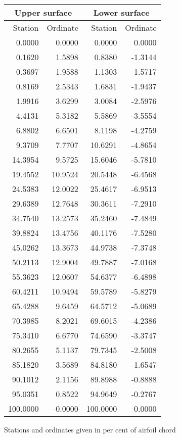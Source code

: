 \documentclass[11pt]{book}
\begin{document}
 \hspace{4mm}
 \begin{tabular}{|r|r|r|r|} \hline 
 \multicolumn{2}{|c|}{Upper surface} & \multicolumn{2}{|c|}{Lower surface} \\
 \hline
 Station & Ordinate & Station & Ordinate \\
 \hline
0.0000 & 0.0000 & 0.0000 & 0.0000 \\
0.1620 & 1.5898 & 0.8380 & -1.3144 \\
0.3697 & 1.9588 & 1.1303 & -1.5717 \\
0.8169 & 2.5343 & 1.6831 & -1.9437 \\
1.9916 & 3.6299 & 3.0084 & -2.5976 \\
4.4131 & 5.3182 & 5.5869 & -3.5554 \\
6.8802 & 6.6501 & 8.1198 & -4.2759 \\
9.3709 & 7.7707 & 10.6291 & -4.8654 \\
14.3954 & 9.5725 & 15.6046 & -5.7810 \\
19.4552 & 10.9524 & 20.5448 & -6.4568 \\
24.5383 & 12.0022 & 25.4617 & -6.9513 \\
29.6389 & 12.7648 & 30.3611 & -7.2910 \\
34.7540 & 13.2573 & 35.2460 & -7.4849 \\
39.8824 & 13.4756 & 40.1176 & -7.5280 \\
45.0262 & 13.3673 & 44.9738 & -7.3748 \\
50.2113 & 12.9004 & 49.7887 & -7.0168 \\
55.3623 & 12.0607 & 54.6377 & -6.4898 \\
60.4211 & 10.9494 & 59.5789 & -5.8279 \\
65.4288 & 9.6459 & 64.5712 & -5.0689 \\
70.3985 & 8.2021 & 69.6015 & -4.2386 \\
75.3410 & 6.6770 & 74.6590 & -3.3747 \\
80.2655 & 5.1137 & 79.7345 & -2.5008 \\
85.1820 & 3.5689 & 84.8180 & -1.6547 \\
90.1012 & 2.1156 & 89.8988 & -0.8888 \\
95.0351 & 0.8522 & 94.9649 & -0.2767 \\
100.0000 & -0.0000 & 100.0000 & 0.0000 \\
 \hline 
 \end{tabular}
 \vspace{8mm}

Stations and ordinates given in per cent of airfoil chord
\end{document}
